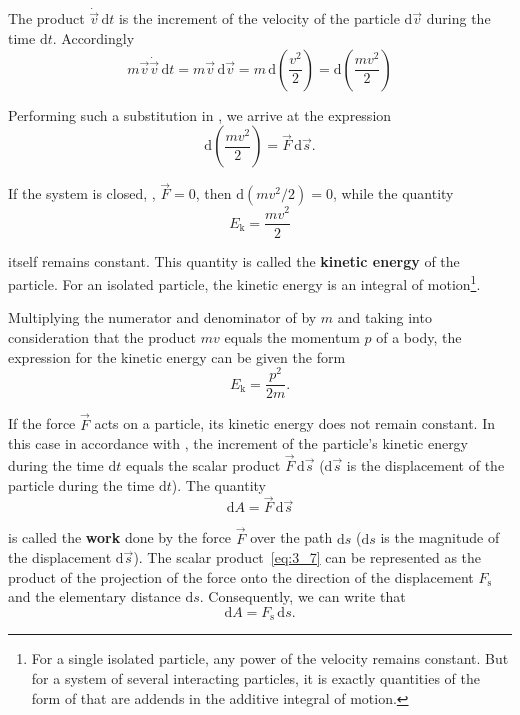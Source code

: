 \noindent
The product $\dot{\vec{v}}\,\mathrm{d}t$ is the increment of the velocity of the particle $\mathrm{d}\vec{v}$ during the time $\mathrm{d}t$. Accordingly
\begin{equation}\label{eq:3_3}
m\vec{v}\dot{\vec{v}}\,\mathrm{d}t = m\vec{v}\,\mathrm{d}\vec{v} = m\,\mathrm{d}\!\left(\frac{v^2}{2}\right) = \mathrm{d}\!\left(\frac{mv^2}{2}\right)
\end{equation}

\noindent
Performing such a substitution in , we arrive at the expression
\begin{equation}\label{eq:3_4}
\mathrm{d}\!\left(\frac{mv^2}{2}\right) = \vec{F}\,\mathrm{d}\vec{s}.
\end{equation}

\noindent
If the system is closed, \ie, $\vec{F}=0$, then $\mathrm{d}(mv^2/2)=0$, while the quantity
\begin{equation}\label{eq:3_5}
E_{\text{k}} = \frac{mv^2}{2}
\end{equation}

\noindent
itself remains constant. This quantity is called the \textbf{kinetic energy} of the particle. For an isolated particle, the kinetic energy is an integral of motion\footnote{For a single isolated particle, any power of the velocity remains constant. But for a system of several interacting particles, it is exactly quantities of the form of  that are addends in the additive integral of motion.}.

Multiplying the numerator and denominator of  by $m$ and taking into consideration that the product $mv$ equals the momentum $p$ of a body, the expression for the kinetic energy can be given the form
\begin{equation}\label{eq:3_6}
E_{\text{k}} = \frac{p^2}{2m}.
\end{equation}

\noindent
If the force $\vec{F}$ acts on a particle, its kinetic energy does not remain constant. In this case in accordance with , the increment of the particle's kinetic energy during the time $\mathrm{d}t$ equals the scalar product $\vec{F}\,\mathrm{d}\vec{s}$ ($\mathrm{d}\vec{s}$ is the displacement of the particle during the time $\mathrm{d}t$). The quantity
\begin{equation}\label{eq:3_7}
\mathrm{d}A = \vec{F}\,\mathrm{d}\vec{s}
\end{equation}

\noindent
is called the \textbf{work} done by the force $\vec{F}$ over the path $\mathrm{d}s$ ($\mathrm{d}s$ is the magnitude of the displacement $\mathrm{d}\vec{s}$). The scalar product~\eqref{eq:3_7} can be represented as the product of the projection of the force onto the direction of the displacement $F_{\text{s}}$ and the elementary distance $\mathrm{d}s$. Consequently, we can write that
\begin{equation}\label{eq:3_8}
\mathrm{d}A = F_{\text{s}}\,\mathrm{d}s.
\end{equation}

